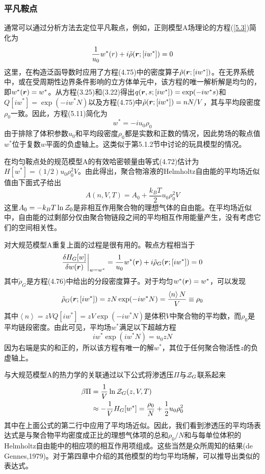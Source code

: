 \subsubsection{平凡鞍点}
通常可以通过分析方法去定位平凡鞍点，例如，正则模型A场理论的方程(\ref{5.3})简化为
\begin{equation}
\frac{1}{u_0}w^*(r)+i\tilde{\rho}(\bm{r};[iw^*])=0
\end{equation}
这里，在构造泛函导数时应用了方程(4.75)中的密度算子$\tilde{\rho}(\bm{r};[iw^*])$。在无界系统中，或在受周期性边界条件影响的立方体单元中，该方程的唯一解析解是均匀的，即$w^*(\bm{r})=w^*$。从方程(3.25)和(3.22)得出$q(\bm{r},s;[iw^*])=\exp(-iw^*s)$和$Q[iw^*]=\exp(-iw^*N)$以及方程(4.75)中$\tilde{\rho}(\bm{r};[iw^*])=nN/V$，其与平均段密度$\rho_0$一致。因此，方程(5.11)简化为
\begin{equation}
w^*=-iu_0\rho_0
\end{equation}
由于排除了体积参数$u_0$和平均段密度$\rho_0$都是实数和正数的情况，因此势场的鞍点值$w^*$位于复数$w$平面的负虚轴上。这类似于第5.1.2节中讨论的玩具模型的情况。

在均匀鞍点处的规范模型A的有效哈密顿量由等式(4.72)估计为$H[w^*]=(1/2)u_0\rho_0^2V$。由此得出，聚合物溶液的Helmholtz自由能的平均场近似值由下面式子给出
\begin{equation}
A(n,V,T)=A_0+\frac{k_BT}{2}u_0\rho_0^2V
\end{equation}
这里$A_0=-k_BT\ln\mathcal{Z}_0$是非相互作用聚合物的理想气体的自由能。在平均场近似中，自由能的过剩部分仅由聚合物链段之间的平均相互作用能量产生，没有考虑它们的空间相关性。

对大规范模型A重复上面的过程是很有用的。鞍点方程相当于
\begin{equation}
\frac{\delta H_G[w]}{\delta w(\bm{r})}\bigg|_{w=w^*}=\frac{1}{u_0}w^*(\bm{r})+i\tilde{\rho}_G(\bm{r};[iw^*])=0
\end{equation}
其中$\tilde{\rho}_G$是方程(4.76)中给出的分段密度算子。对于均匀$w^*(\bm{r})=w^*$，可以发现
\begin{equation}
\tilde{\rho}_G(\bm{r};[iw^*])=zN\exp(-iw^*N)=\frac{\left\langle n\right\rangle N}{V}\equiv\rho_0
\end{equation}
其中$\left\langle n\right\rangle=zVQ[iw^*]=zV\exp(-iw^*N)$是体积$V$中聚合物的平均数，而$\rho_0$是平均链段密度。由此可见，平均场$w^*$满足以下超越方程
\begin{equation}
iw^*\exp(iw^*N)=u_0zN
\end{equation}
因为右端是实的和正的，所以该方程有唯一的解$w^*$，其位于任何聚合物活性$z$的负虚轴上。

与大规范模型A的热力学的关联通过以下公式将渗透压$\Pi$与$\mathcal{Z}_G$联系起来
\begin{equation}
\begin{aligned}
\beta\Pi&=\frac{1}{V}\ln\mathcal{Z}_G(z,V,T)\\
&\approx-\frac{1}{V}H_G[w^*]=\frac{\rho_0}{N}+\frac{1}{2}u_0\rho_0^2
\end{aligned}
\end{equation}
其中在上面公式的第二行中应用了平均场近似。因此，我们看到渗透压的平均场表达式是与聚合物平均密度成正比的理想气体项的总和$\rho_0/N$和与每单位体积的Helmholtz自由能中的相应项的相互作用项组成。这些当然是众所周知的结果(de Gennes,1979)。对于第四章中介绍的其他模型的均匀平均场解，可以推导出类似的表达式。

